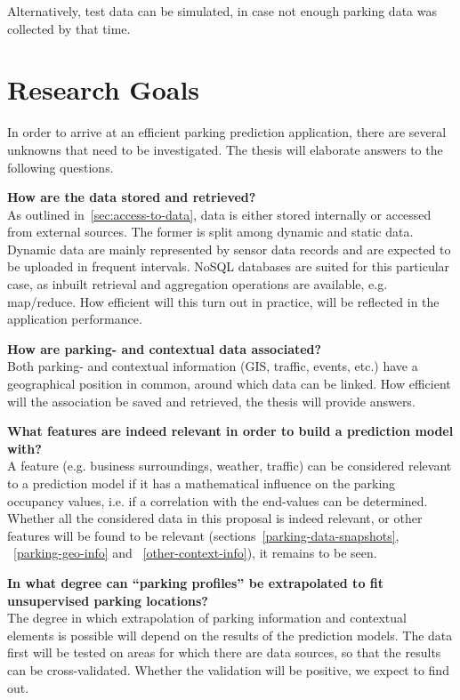 \documentclass{article}
\begin{document}
\vspace{2mm}
Alternatively, test data can be simulated, in case not enough parking data was collected by that time.

\section{Research Goals}
In order to arrive at an efficient parking prediction application, there are several unknowns that need to be investigated. The thesis will elaborate answers to the following questions.

\vspace{2mm}
\textbf{How are the data stored and retrieved?}\\
As outlined in~\ref{sec:access-to-data}, data is either stored internally or accessed from external sources. The former is split among dynamic and static data. Dynamic data are mainly represented by sensor data records and are expected to be uploaded in frequent intervals. NoSQL databases are suited for this particular case, as inbuilt retrieval and aggregation operations are available, e.g. map/reduce. How efficient will this turn out in practice, will be reflected in the application performance.

\vspace{2mm}
\textbf{How are parking- and contextual data associated?}\\
Both parking- and contextual information (GIS, traffic, events, etc.) have a geographical position in common, around which data can be linked. How efficient will the association be saved and retrieved, the thesis will provide answers.

\vspace{2mm}
\textbf{What features are indeed relevant in order to build a prediction model with?}\\
A feature (e.g. business surroundings, weather, traffic) can be considered relevant to a prediction model if it has a mathematical influence on the parking occupancy values, i.e. if a correlation with the end-values can be determined. Whether all the considered data in this proposal is indeed relevant, or other features will be found to be relevant (sections~\ref{parking-data-snapshots}, ~\ref{parking-geo-info} and ~\ref{other-context-info}), it remains to be seen.

\vspace{2mm}
\textbf{In what degree can ``parking profiles'' be extrapolated to fit unsupervised parking locations?}\\
The degree in which extrapolation of parking information and contextual elements is possible will depend on the results of the prediction models. The data first will be tested on areas for which there are data sources, so that the results can be cross-validated. Whether the validation will be positive, we expect to find out.
\end{document}
